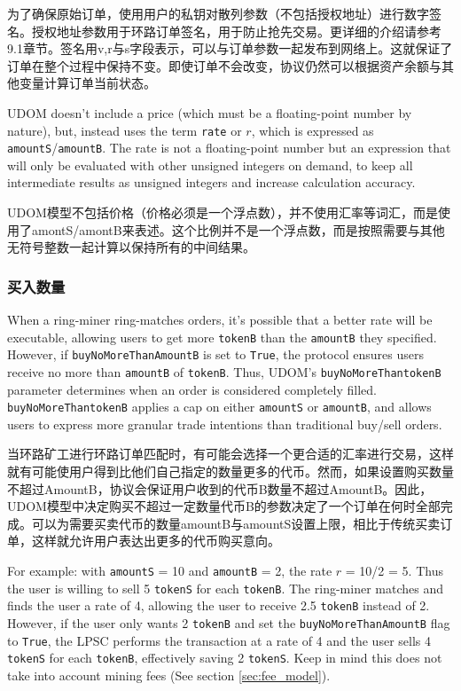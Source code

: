 \documentclass[UTF8,nofonts]{ctexart}
\begin{document}
\begin{multicols}{2}
为了确保原始订单，使用用户的私钥对散列参数（不包括授权地址）进行数字签名。授权地址参数用于环路订单签名，用于防止抢先交易。更详细的介绍请参考9.1章节。签名用v,r与s字段表示，可以与订单参数一起发布到网络上。这就保证了订单在整个过程中保持不变。即使订单不会改变，协议仍然可以根据资产余额与其他变量计算订单当前状态。



UDOM doesn't include a price (which must be a floating-point number by nature), but, instead uses the term \verb|rate| or $r$, which is expressed as \verb|amountS|/\verb|amountB|. The rate is not a floating-point number but an expression that will only be evaluated with other unsigned integers on demand, to keep all intermediate results as unsigned integers and increase calculation accuracy. 

UDOM模型不包括价格（价格必须是一个浮点数），并不使用汇率等词汇，而是使用了amontS/amontB来表述。这个比例并不是一个浮点数，而是按照需要与其他无符号整数一起计算以保持所有的中间结果。

\subsubsection{买入数量}

When a ring-miner ring-matches orders, it's possible that a better rate will be executable, allowing users to get more \verb|tokenB| than the \verb|amountB| they specified. However, if \verb|buyNoMoreThanAmountB| is set to \verb|True|, the protocol ensures users receive no more than \verb|amountB| of \verb|tokenB|. Thus, UDOM's \verb|buyNoMoreThantokenB| parameter determines when an order is considered completely filled. \verb|buyNoMoreThantokenB| applies a cap on either \verb|amountS| or \verb|amountB|, and allows users to express more granular trade intentions than traditional buy/sell orders.

当环路矿工进行环路订单匹配时，有可能会选择一个更合适的汇率进行交易，这样就有可能使用户得到比他们自己指定的数量更多的代币。然而，如果设置购买数量不超过AmountB，协议会保证用户收到的代币B数量不超过AmountB。因此，UDOM模型中决定购买不超过一定数量代币B的参数决定了一个订单在何时全部完成。可以为需要买卖代币的数量amountB与amountS设置上限，相比于传统买卖订单，这样就允许用户表达出更多的代币购买意向。



For example: with \verb|amountS| = 10 and \verb|amountB| = 2, the rate $r$ = 10/2 = 5. Thus the user is willing to sell 5 \verb|tokenS| for each \verb|tokenB|. The ring-miner matches and finds the user a rate of 4, allowing the user to receive 2.5 \verb|tokenB| instead of 2. However, if the user only wants 2 \verb|tokenB| and set the \verb|buyNoMoreThanAmountB| flag to \verb|True|, the LPSC performs the transaction at a rate of 4 and the user sells 4 \verb|tokenS| for each \verb|tokenB|, effectively saving 2 \verb|tokenS|. Keep in mind this does not take into account mining fees (See section \ref{sec:fee_model}).


\end{multicols}
\end{document}
